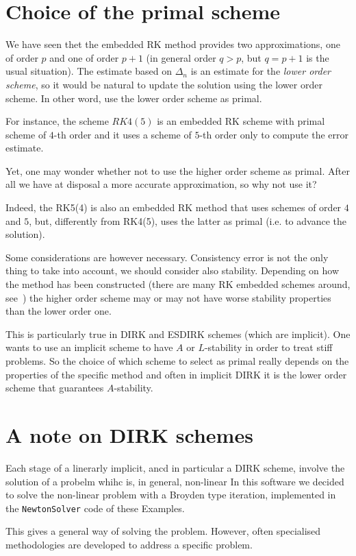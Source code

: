 \documentclass[10pt,a4paper,twoside]{article}
\begin{document}
\section{Choice of the primal scheme}
We have seen thet the embedded RK method provides two approximations, one of order $p$ and one of order $p+1$ (in general order $q>p$, but $q=p+1$ is the usual situation). The estimate based on $\Delta_n$ is an estimate for the \emph{lower order scheme}, so it would be natural to update
the solution using the lower order scheme. In other word, use the lower order scheme as primal.

For instance, the scheme $RK4(5)$ is an embedded RK scheme with primal scheme of $4$-th order and it uses a scheme of $5$-th order only to compute the error estimate.

Yet, one may wonder whether not to use the higher order scheme as primal. After all we have at disposal a more accurate approximation, so why not use it?

Indeed, the RK5(4) is also an embedded RK method that uses schemes of order $4$ and $5$, but, differently from RK4(5), uses the latter as primal (i.e. to advance the solution).

Some considerations are however necessary. Consistency error is not the only thing to take into account, we should consider also stability. Depending on how the method has been constructed (there are many RK embedded schemes around, see~\cite{RungeKuttaMethods2016}) the higher order scheme may or may not have worse stability properties than the lower order one.

This is particularly true in DIRK and ESDIRK schemes (which are implicit). One wants to use an implicit scheme to have $A$ or $L$-stability in order to treat stiff problems. So the choice of which scheme to select as primal really depends on the properties of the specific method and often in implicit DIRK it is the lower order scheme that guarantees $A$-stability.

\section{A note on DIRK schemes}
Each stage of a linerarly implicit, ancd in particular a DIRK scheme, involve the solution of a probelm whihc is, in general, non-linear
In this software we decided to solve the non-linear problem with a Broyden type iteration, implemented in the
\texttt{NewtonSolver} code of these Examples. 

This gives a general way of solving the problem. However, often specialised methodologies are developed to address a specific problem.



\end{document}
